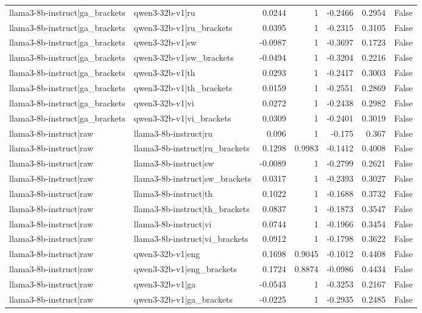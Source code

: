 \begin{table}
\begin{tabular}{l l r r r r l}
llama3-8b-instruct|ga_brackets & qwen3-32b-v1|ru & 0.0244 & 1 & -0.2466 & 0.2954 & False \\
llama3-8b-instruct|ga_brackets & qwen3-32b-v1|ru_brackets & 0.0395 & 1 & -0.2315 & 0.3105 & False \\
llama3-8b-instruct|ga_brackets & qwen3-32b-v1|sw & -0.0987 & 1 & -0.3697 & 0.1723 & False \\
llama3-8b-instruct|ga_brackets & qwen3-32b-v1|sw_brackets & -0.0494 & 1 & -0.3204 & 0.2216 & False \\
llama3-8b-instruct|ga_brackets & qwen3-32b-v1|th & 0.0293 & 1 & -0.2417 & 0.3003 & False \\
llama3-8b-instruct|ga_brackets & qwen3-32b-v1|th_brackets & 0.0159 & 1 & -0.2551 & 0.2869 & False \\
llama3-8b-instruct|ga_brackets & qwen3-32b-v1|vi & 0.0272 & 1 & -0.2438 & 0.2982 & False \\
llama3-8b-instruct|ga_brackets & qwen3-32b-v1|vi_brackets & 0.0309 & 1 & -0.2401 & 0.3019 & False \\
llama3-8b-instruct|raw & llama3-8b-instruct|ru & 0.096 & 1 & -0.175 & 0.367 & False \\
llama3-8b-instruct|raw & llama3-8b-instruct|ru_brackets & 0.1298 & 0.9983 & -0.1412 & 0.4008 & False \\
llama3-8b-instruct|raw & llama3-8b-instruct|sw & -0.0089 & 1 & -0.2799 & 0.2621 & False \\
llama3-8b-instruct|raw & llama3-8b-instruct|sw_brackets & 0.0317 & 1 & -0.2393 & 0.3027 & False \\
llama3-8b-instruct|raw & llama3-8b-instruct|th & 0.1022 & 1 & -0.1688 & 0.3732 & False \\
llama3-8b-instruct|raw & llama3-8b-instruct|th_brackets & 0.0837 & 1 & -0.1873 & 0.3547 & False \\
llama3-8b-instruct|raw & llama3-8b-instruct|vi & 0.0744 & 1 & -0.1966 & 0.3454 & False \\
llama3-8b-instruct|raw & llama3-8b-instruct|vi_brackets & 0.0912 & 1 & -0.1798 & 0.3622 & False \\
llama3-8b-instruct|raw & qwen3-32b-v1|eng & 0.1698 & 0.9045 & -0.1012 & 0.4408 & False \\
llama3-8b-instruct|raw & qwen3-32b-v1|eng_brackets & 0.1724 & 0.8874 & -0.0986 & 0.4434 & False \\
llama3-8b-instruct|raw & qwen3-32b-v1|ga & -0.0543 & 1 & -0.3253 & 0.2167 & False \\
llama3-8b-instruct|raw & qwen3-32b-v1|ga_brackets & -0.0225 & 1 & -0.2935 & 0.2485 & False \\

\end{tabular}
\end{table}
